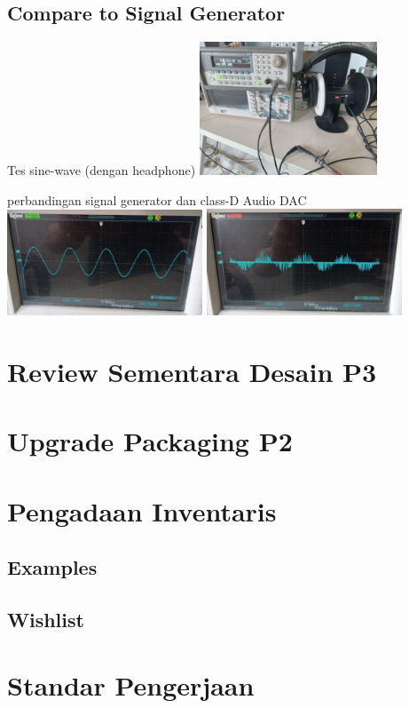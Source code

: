 \documentclass[table,dvipsnames]{beamer}
\begin{document}
	\begin{frame}
		\subsection{Compare to Signal Generator}
		\begin{exampleblock}{Tes sine-wave (dengan headphone)}
			\centering
			\includegraphics[width=150pt]{images/sine_sig_test}
		\end{exampleblock}
	
		\begin{exampleblock}{perbandingan signal generator dan class-D Audio DAC}
			\includegraphics[width=165pt]{images/sine_sig_gen}
			\includegraphics[width=165pt]{images/sine_sig_dac}
		\end{exampleblock}
	\end{frame}
	
	\section {Review Sementara Desain P3}
	
	\section{Upgrade Packaging P2}
	
	\section{Pengadaan Inventaris}
	
	\subsection{Examples}
	
	\subsection{Wishlist}
	
	\section{Standar Pengerjaan}
\end{document}
